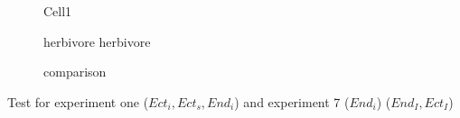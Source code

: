 



\begin{figure}
\centering

\caption{Cell1}
\label{fig:chap:res:dyn:cell1}
\end{figure}




\begin{figure}
\centering

\caption[Effect of carnivore group composition on herbivore biomass and abundance density]{herbivore herbivore}
\label{fig:chap:res:dyn:compherb}
\end{figure}


\begin{figure}
\centering

\caption[Comparison to empirical data]{comparison}
\label{fig:chap:res:dyn:compherb}
\end{figure}

Test for experiment one ($Ect_i, Ect_s, End_i$) and experiment 7 ($End_i$) ($End_I, Ect_I$)

%
%